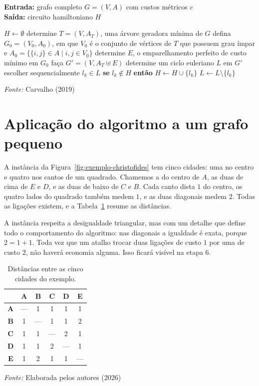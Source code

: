 \begin{algorithm}[ht]
	\caption{\textsc{Christofides}$(G)$}
	\label{alg:christofides}
	\noindent\textbf{Entrada:} grafo completo $G = (V, A)$ com custos métricos $c$\\
	\noindent\textbf{Saída:} circuito hamiltoniano $H$
	\begin{algorithmic}[1]
	\STATE $H \gets \emptyset$
	\STATE determine $T = (V, A_T)$, uma árvore geradora mínima de $G$
	\STATE defina $G_0 = (V_0, A_0)$, em que $V_0$ é o conjunto de vértices de $T$
	que possuem grau ímpar e $A_0 = \{\{i,j\} \in A \mid i,j \in V_0\}$
	\STATE determine $E$, o emparelhamento perfeito de custo mínimo em $G_0$
	\STATE faça $G' = (V, A_T \uplus E)$
	\STATE determine um ciclo euleriano $L$ em $G'$
	\STATE {}
	\STATE escolher sequencialmente $l_k \in L$
	\STATE \textbf{se} $l_k \notin H$ \textbf{então} $H \gets H \cup \{l_k\}$
	\STATE $L \gets L \setminus \{l_k\}$
	\ENDWHILE
	\end{algorithmic}
	\footnotesize{\textit{Fonte:} Carvalho (2019)}
\end{algorithm}

\section{Aplicação do algoritmo a um grafo pequeno}
\label{sec:aplicacao-christofides}

A instância da Figura~\ref{fig:exemplo-christofides} tem cinco cidades: uma no
centro e quatro nos cantos de um quadrado. Chamemos a do centro de $A$, as duas
de cima de $E$ e $D$, e as duas de baixo de $C$ e $B$. Cada canto dista $1$ do
centro, os quatro lados do quadrado também medem $1$, e as duas diagonais medem
$2$. Todas as ligações existem, e a Tabela~\ref{tab:distancias-quadrado} resume
as distâncias.

A instância respeita a desigualdade triangular, mas com um detalhe que define
todo o comportamento do algoritmo: nas diagonais a igualdade é exata, porque
$2 = 1 + 1$. Toda vez que um atalho trocar duas ligações de custo $1$ por uma de
custo $2$, não haverá economia alguma. Isso ficará visível na etapa 6.

\begin{table}[!ht]
	\centering
	\caption{Distâncias entre as cinco cidades do exemplo.}
	\label{tab:distancias-quadrado}
	\begin{tabular}{cccccc}
	\hline
	& \textbf{A} & \textbf{B} & \textbf{C} & \textbf{D} & \textbf{E} \\
	\hline
	\textbf{A} & --- & 1 & 1 & 1 & 1 \\
	\textbf{B} & 1 & --- & 1 & 1 & 2 \\
	\textbf{C} & 1 & 1 & --- & 2 & 1 \\
	\textbf{D} & 1 & 1 & 2 & --- & 1 \\
	\textbf{E} & 1 & 2 & 1 & 1 & --- \\
	\hline
	\end{tabular}
	\footnotesize{\textit{Fonte:} Elaborada pelos autores (2026)}
\end{table}

